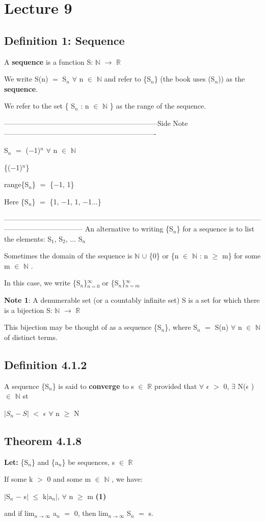 \documentclass{article}
\newcommand{\mt}[1]{\ensuremath{#1}}
\newcommand\bsc[2][\DefaultOpt]{%
  \def\DefaultOpt{#2}%
  \section[#1]{#2}%
}
\newcommand\ssc[2][\DefaultOpt]{%
  \def\DefaultOpt{#2}%
  \subsection[#1]{#2}%
}
\newcommand{\lt}[1]{\textbf{Let: } #1}
\newcommand{\bpth}[1]{\textbf{(#1)}}
\newcommand{\sidenote}[1]{-----------------------------------------------------------------Side Note----------------------------------------------------------------
#1 \

---------------------------------------------------------------------------------------------------------------------------------------------}
\newcommand{\br}{\mt{\mathbb{R}} }       %
\newcommand{\bn}{\mt{\mathbb{N}} }       %
\newcommand{\ep}{\mt{\epsilon} }         %
\newcommand{\fa}{\mt{\forall} }          %
\newcommand{\mem}{\mt{\in} }
\newcommand{\exs}{\mt{\exists} }
\newcommand{\lra}{ \mt{\longrightarrow} } %
\newcommand{\eql}{\mt{=} }
\newcommand{\uw}[2]{#1\mt{_{#2}}}
\begin{document}
\bsc{Lecture 9}{

\ssc{Definition 1: Sequence}{

A \textbf{sequence} is a function S: \bn \lra \br

We write S(n) \eql \uw{S}{n} \fa n \mem \bn and refer to \{\uw{S}{n}\} (the book uses (\uw{S}{n})) as the \textbf{sequence}.

We refer to the set \{ \uw{S}{n} : n \mem \bn\} as the range of the sequence.

\sidenote{
\uw{S}{n} \eql ($-$1)$^n$ \fa n \mem \bn

\{($-$1)$^n$\}

range\{\uw{S}{n}\} \eql \{$-$1, 1\}

Here \{\uw{S}{n}\} \eql \{1, $-$1, 1, $-$1...\}
}
An alternative to writing \{\uw{S}{n}\} for a sequence is to list the elements: \uw{S}{1}, \uw{S}{2}, ... \uw{S}{n}

Sometimes the domain of the sequence is \bn $\cup$ \{0\} or \{n \mem \bn : n $\geq$ m\} for some m \mem \bn.

In this case, we write \{\uw{S}{n}\}$^\infty_{n = 0}$ or \{\uw{S}{n}\}$^\infty_{n = m}$

\textbf{Note 1}: A denumerable set (or a countably infinite set) S is a set for which there is a bijection S: \bn \lra \br

This bijection may be thought of as a sequence \{\uw{S}{n}\}, where \uw{S}{n} \eql S(n) \fa n \mem \bn of distinct terms.
}

\ssc{Definition 4.1.2}{

A sequence \{\uw{S}{n}\} is said to \textbf{converge} to s \mem \br provided that \fa \ep $>$ 0, \exs N(\ep) \mem \bn st

$|\uw{S}{n} - S|$ $<$ \ep \textrm{   } \fa n $\geq$ N
}

\ssc{Theorem 4.1.8}{

\lt{\{\uw{S}{n}\} and \{\uw{a}{n}\} be sequences, s \mem \br}

If some k $>$ 0 and some m \mem \bn, we have:

$|$\uw{S}{n} $-$ s$|$ $\leq$ k$|$\uw{a}{n}$|$, \fa n $\geq$ m \bpth{1}

and if lim$_{n\lra\infty}$ \uw{a}{n} \eql 0, then lim$_{n\lra\infty}$ \uw{S}{n} \eql s.

}

}

\newpage
\end{document}
